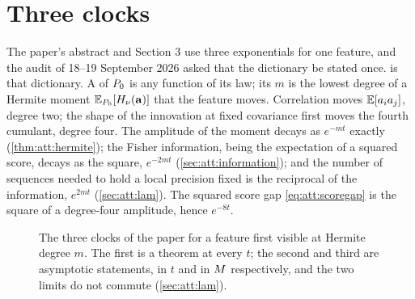 \section{Three clocks}
\label{sec:att:clocks}

The paper's abstract and Section 3 use three exponentials for one feature, and the
audit of 18--19 September 2026 asked that the dictionary be stated once.
 is that dictionary. A  of $P_0$ is any function of
its law; its  $m$ is the lowest degree of a Hermite moment
$\mathbb{E}_{P_0}[H_\nu(\mathbf{a})]$ that the feature moves. Correlation moves $\mathbb{E}[a_ia_j]$, degree
two; the shape of the innovation at fixed covariance first moves the fourth cumulant,
degree four. The amplitude of the moment decays as $e^{-mt}$ exactly
(\cref{thm:att:hermite}); the Fisher information, being the expectation of a squared
score, decays as the square, $e^{-2mt}$ (\cref{sec:att:information}); and the number
of sequences needed to hold a local precision fixed is the reciprocal of the
information, $e^{2mt}$ (\cref{sec:att:lam}). The squared score gap
\cref{eq:att:scoregap} is the square of a degree-four amplitude, hence $e^{-8t}$.

\begin{figure}[t]
\centering
{}
\caption{The three clocks of the paper for a feature first visible at Hermite degree
$m$. The first is a theorem at every $t$; the second and third are asymptotic
statements, in $t$ and in $M$ respectively, and the two limits do not commute
(\cref{sec:att:lam}).}
\label{fig:att:clocks}
\end{figure}

